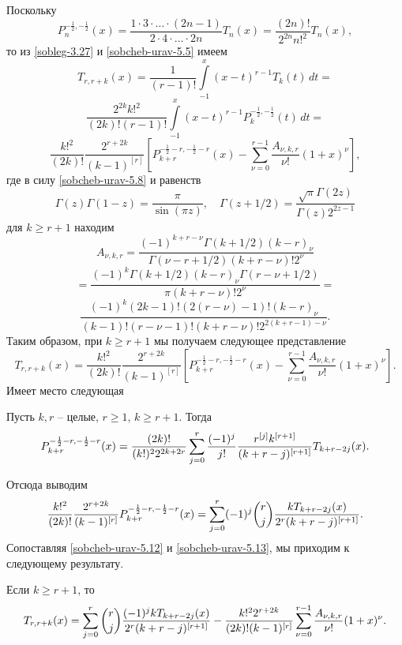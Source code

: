 Поскольку \cite{laplas-Sege}
\begin{equation}\label{sobcheb-urav-3.12}
P_n^{-\frac{1}{2},-\frac{1}{2}}(x)=\frac{1\cdot3\cdot\ldots\cdot(2n-1)}
{2\cdot4\cdot\ldots\cdot2n}T_n(x)=\frac{(2n)!}{2^{2n}{n!}^2}T_n(x),
\end{equation}
то из \eqref{sobleg-3.27} и  \eqref{sobcheb-urav-5.5} имеем
$$
T_{r,r+k}(x)=\frac{1}{(r-1)!}\int\limits^x_{-1}(x-t)^{r-1}T_k(t)\,dt=
$$
$$
\frac{2^{2k}k!^2}{(2k)!(r-1)!}\int\limits^x_{-1}(x-t)^{r-1}P_k^{-\frac12,-\frac12}(t)\,dt=
$$
\begin{equation}\label{sobcheb-urav-5.10}
\frac{k!^2}{(2k)!}
\frac{2^{r+2k}}{(k-1)^{[r]}}\left[P_{k+r}^{-\frac12-r,-\frac12-r}(x)-\sum^{r-1}_{\nu=0}
\frac{A_{\nu,k,r}}{\nu!}(1+x)^{\nu}\right],
\end{equation}
где в силу \eqref{sobcheb-urav-5.8} и равенств
$$
\Gamma(z)\Gamma(1-z)=\frac{\pi}{\sin(\pi z)},\quad \Gamma(z+1/2)=\frac{\sqrt{\pi}\Gamma(2z)}{\Gamma(z)2^{2z-1}}
$$
 для $k\ge r+1$ находим
$$
A_{\nu,k,r}=
\frac{(-1)^{k+r-\nu}\Gamma(k+1/2)(k-r)_{\nu}}{\Gamma(\nu-r+1/2)(k+r-\nu)!2^\nu}
$$
$$
=\frac{(-1)^{k}\Gamma(k+1/2)(k-r)_{\nu}\Gamma(r-\nu+1/2)}{\pi (k+r-\nu)!2^\nu}=
$$
\begin{equation}\label{sobcheb-urav-5.11}
\frac{(-1)^{k}(2k-1)!(2(r-\nu)-1)!(k-r)_{\nu}}{(k-1)!(r-\nu-1)! (k+r-\nu)!2^{2(k+r-1)-\nu}}.
\end{equation}
Таким образом, при $k\ge r+1$ мы получаем следующее представление
\begin{equation}\label{sobcheb-urav-5.12}
T_{r,r+k}(x)=\frac{k!^2}{(2k)!}
\frac{2^{r+2k}}{(k-1)^{[r]}}\left[P_{k+r}^{-\frac12-r,-\frac12-r}(x)-
\sum^{r-1}_{\nu=0}\frac{A_{\nu,k,r}}{\nu!}(1+x)^{\nu}\right].
\end{equation}
Имеет место следующая

\begin{lemma}\label{sobcheb-uravlemma3}
Пусть  $k,r$ -- целые, $r\ge1$,
     $k\ge r+1$. Тогда
 $$
P_{k+r}^{-\frac12-r,-\frac12-r}(x)={(2k)!\over(k!)^22^{2k+2r}}\sum_{j=0}^r{(-1)^j\over j!}
{r^{[j]}k^{[r+1]}\over(k+r-j)^{[r+1]}}T_{k+r-2j}(x).
     $$
\end{lemma}
Отсюда выводим
\begin{equation}\label{sobcheb-urav-5.13}
\frac{k!^2}{(2k)!}
\frac{2^{r+2k}}{(k-1)^{[r]}}P_{k+r}^{-\frac12-r,-\frac12-r}(x)=
\sum_{j=0}^r(-1)^j{r\choose j}
{kT_{k+r-2j}(x)\over2^r(k+r-j)^{[r+1]}}.
\end{equation}
Сопоставляя \eqref{sobcheb-urav-5.12} и  \eqref{sobcheb-urav-5.13}, мы приходим к следующему результату.
\begin{theorem}\label{sobcheb-uravtheo4}
Если  $k\ge r+1$, то
\begin{equation}\label{sobcheb-urav-5.14}
T_{r,r+k}(x)=\sum_{j=0}^r{r\choose j}
{(-1)^jkT_{k+r-2j}(x)\over2^r(k+r-j)^{[r+1]}}
-\frac{k!^22^{r+2k}}{(2k)!(k-1)^{[r]}}
\sum^{r-1}_{\nu=0}\frac{A_{\nu,k,r}}{\nu!}(1+x)^{\nu}.
\end{equation}
\end{theorem}

